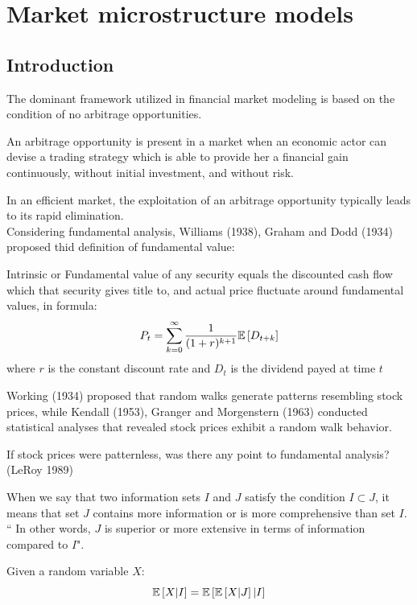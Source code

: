 \chapter{Market microstructure models}
\label{chap:market_microstructure}
\section{Introduction}
The dominant framework utilized in financial market modeling is based on the condition of no arbitrage opportunities.
\begin{mydefinition}[Arbitrage]
	An arbitrage opportunity is present in a market when an economic actor can devise a
	trading strategy which is able to provide her a financial gain continuously, without initial
	investment, and without risk.
	\label{arbitrage}
\end{mydefinition}
In an efficient market, the exploitation of an arbitrage opportunity typically leads to its rapid elimination.\\
Considering fundamental analysis, Williams (1938), Graham and Dodd (1934) proposed thid definition of fundamental value:
\begin{mydefinition}
Intrinsic or Fundamental value of any security equals the discounted cash flow which that security gives title to, and actual price fluctuate around fundamental values, in formula:
\begin{equation}
	P_t = \sum_{k=0}^{\infty}\frac{1}{(1+r)^{k+1}} \mathbb{E}\left[D_{t+k}\right]
\end{equation}
where $r$ is the constant discount rate and $D_t$ is the dividend payed at time $t$
\label{fundamental_price}
\end{mydefinition}
Working (1934) proposed that random walks generate patterns resembling stock prices, while Kendall (1953), Granger and Morgenstern (1963) conducted statistical analyses that revealed stock prices exhibit a random walk behavior.
\begin{myquote}
	If stock prices were patternless, was there any point to fundamental analysis? (LeRoy 1989)
\end{myquote}
When we say that two information sets $I$ and $J$ satisfy the condition $I \subset J$, it means that set $J$ contains more information or is more comprehensive than set $I$.\\`` In other words, $J$ is superior or more extensive in terms of information compared to $I$".
\begin{mydefinition}
Given a random variable $X$:
\begin{equation}
	\mathbb{E}\left[X | I\right] = \mathbb{E}\left[\mathbb{E}\left[X|J\right]|I\right]
\end{equation}
\end{mydefinition}
